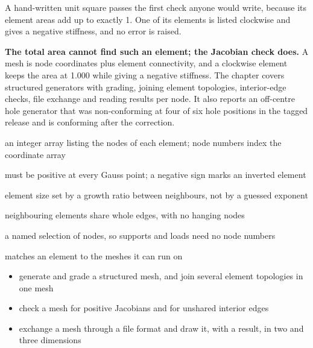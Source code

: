 \newpage\thispagestyle{hl}
\begin{hlquote}A hand-written unit square passes the first check anyone would write, because its element areas add up to exactly 1. One of its elements is listed clockwise and gives a negative stiffness, and no error is raised.\end{hlquote}
\vspace{8pt}\begin{hlsum}\textbf{The total area cannot find such an element; the Jacobian check does.} A mesh is node coordinates plus element connectivity, and a clockwise element keeps the area at 1.000 while giving a negative stiffness. The chapter covers structured generators with grading, joining element topologies, interior-edge checks, file exchange and reading results per node. It also reports an off-centre hole generator that was non-conforming at four of six hole positions in the tagged release and is conforming after the correction.\end{hlsum}
\begin{description}\setlength\itemsep{5pt}\setlength\parsep{0pt}\renewcommand{\descriptionlabel}[1]{\hspace{\labelsep}\sffamily\bfseries\color{hlnavy}#1}
\item[Connectivity] an integer array listing the nodes of each element; node numbers index the coordinate array
\item[Jacobian determinant] must be positive at every Gauss point; a negative sign marks an inverted element
\item[Graded mesh] element size set by a growth ratio between neighbours, not by a guessed exponent
\item[Conforming mesh] neighbouring elements share whole edges, with no hanging nodes
\item[Node set] a named selection of nodes, so supports and loads need no node numbers
\item[Mesh dispatcher] matches an element to the meshes it can run on
\end{description}
\begin{itemize}\setlength\itemsep{3pt}
\item generate and grade a structured mesh, and join several element topologies in one mesh
\item check a mesh for positive Jacobians and for unshared interior edges
\item exchange a mesh through a file format and draw it, with a result, in two and three dimensions
\end{itemize}
